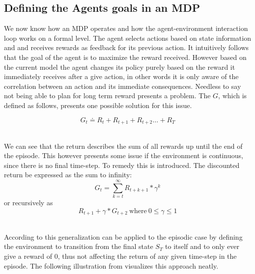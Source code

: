 \subsection{Defining the Agents goals in an MDP}\label{subsec:goals}

We now know how an MDP operates and how the agent-environment interaction loop works on a formal level. The agent selects actions based on state information and and receives rewards as feedback for its previous action. It intuitively follows that the goal of the agent is to maximize the reward received. However based on the current model the agent changes its policy purely based on the reward it immediately receives after a give action, in other words it is only aware of the correlation between an action and its immediate consequences. Needless to say not being able to plan for long term reward presents a problem. The  $G$, which is defined as follows, presents one possible solution for this issue.

\begin{equation}\label{MDP:return}
    G_t \doteq R_t + R_{t+1} + R_{t+2} \dots + R_T
\end{equation}
\centerline{\small{}}

\noindent
\\ We can see that the return describes the sum of all rewards up until the end of the episode. This however presents some issue if the environment is continuous, since there is no final time-step. To remedy this  is introduced.  The discounted return be expressed as the sum to infinity:
\begin{equation}\label{MDP:discounted_return}
    G_t = \sum_{k=t}^{\infty} R_{t+k+1} * \gamma ^k 
\end{equation}
or recursively as
\begin{equation}\label{MDP:recursive_discounted_return}
    R_{t+1} + \gamma *G_{t+2} \mathrm{\ where\ } 0 \leq \gamma \leq 1
\end{equation}
\centerline{\small{}}

\noindent
\\ According to  this generalization can be applied to the episodic case by defining the environment to transition from the final state $S_T$ to itself and to only ever give a reward of 0, thus not affecting the return of any given time-step in the episode. The following illustration from  visualizes this approach neatly.

